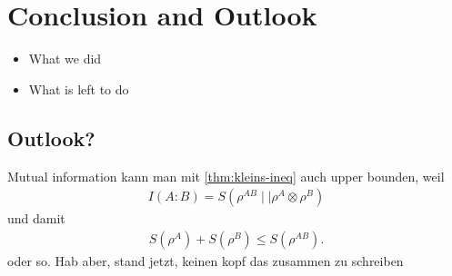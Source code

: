 \chapter*{Conclusion and Outlook}

\begin{itemize}
  \item What we did
  \item What is left to do
\end{itemize}


\section*{Outlook?}
Mutual information kann man mit \cref{thm:kleins-ineq} auch upper bounden, weil 
\begin{align}
  I\left( A:B \right) = S\left( \rho^{AB} \mid\mid \rho^A \otimes \rho^B \right) 
\end{align}
und damit
\begin{align}
  S(\rho^A) + S(\rho^B) \leq S(\rho^{AB})
.\end{align}
oder so. Hab aber, stand jetzt, keinen kopf das zusammen zu schreiben
